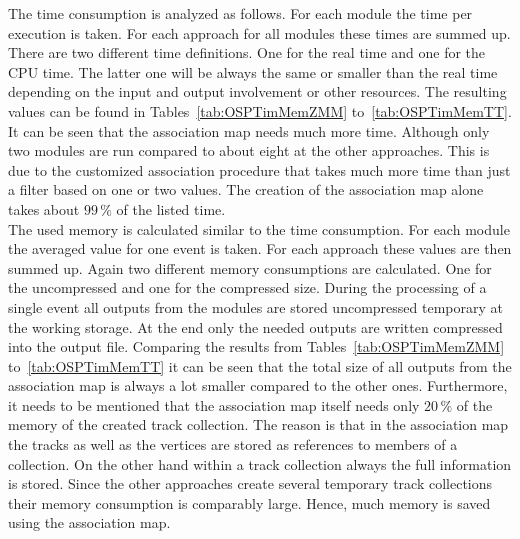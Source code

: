 The time consumption is analyzed as follows. For each module the time per execution is taken. For each approach for all modules these times are summed up. There are two different time definitions. One for the real time and one for the CPU time. The latter one will be always the same or smaller than the real time depending on the input and output involvement or other resources. The resulting values can be found in Tables~\ref{tab:OSPTimMemZMM} to~\ref{tab:OSPTimMemTT}. It can be seen that the association map needs much more time. Although only two modules are run compared to about eight at the other approaches. This is due to the customized association procedure that takes much more time than just a filter based on one or two values. The creation of the association map alone takes about $99\,\%$ of the listed time. \\
The used memory is calculated similar to the time consumption. For each module the averaged value for one event is taken. For each approach these values are then summed up. Again two different memory consumptions are calculated. One for the uncompressed and one for the compressed size. During the processing of a single event all outputs from the modules are stored uncompressed temporary at the working storage. At the end only the needed outputs are written compressed into the output file. Comparing the results from Tables~\ref{tab:OSPTimMemZMM} to~\ref{tab:OSPTimMemTT} it can be seen that the total size of all outputs from the association map is always a lot smaller compared to the other ones. Furthermore, it needs to be mentioned that the association map itself needs only $20\,\%$ of the memory of the created track collection. The reason is that in the association map the tracks as well as the vertices are stored as references to members of a collection. On the other hand within a track collection always the full information is stored. Since the other approaches create several temporary track collections their memory consumption is comparably large. Hence, much memory is saved using the association map.


